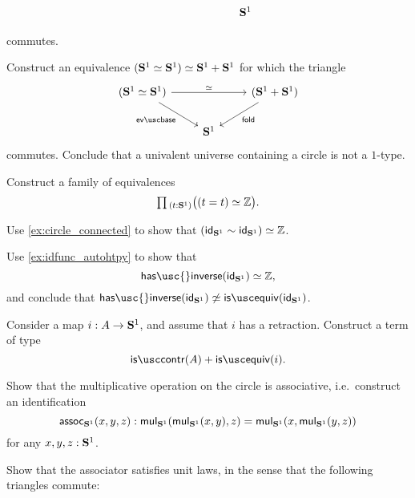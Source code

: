 \begin{exercises}
\begin{subexenum}
\begin{equation*}
\begin{tikzcd}[column sep=tiny]
\phantom{\sm{t:\sphere{1}}\mathcal{T}(t)} & \sphere{1}
\end{tikzcd}
\end{equation*}
commutes.
\end{subexenum}
\exercise Construct an equivalence $\eqv{(\eqv{\sphere{1}}{\sphere{1}})}{\sphere{1}+\sphere{1}}$ for which the triangle
\begin{equation*}
  \begin{tikzcd}
    (\eqv{\sphere{1}}{\sphere{1}}) \arrow[rr,"\simeq"] \arrow[dr,swap,"\evbase"] & & (\sphere{1}+\sphere{1}) \arrow[dl,"\fold"] \\
    & \sphere{1}
  \end{tikzcd}
\end{equation*}
commutes. Conclude that a univalent universe containing a circle is not a $1$-type.
\exercise \label{ex:is_invertible_id_S1}
\begin{subexenum}
\item Construct a family of equivalences
\begin{equation*}
\prd{t:\sphere{1}} \big(\eqv{(t=t)}{\Z}\big).
\end{equation*}
\item Use \cref{ex:circle_connected} to show that $\eqv{(\idfunc[\sphere{1}]\htpy\idfunc[\sphere{1}])}{\Z}$.
\item Use \cref{ex:idfunc_autohtpy} to show that
\begin{equation*}
\eqv{\mathsf{has\usc{}inverse}(\idfunc[\sphere{1}])}{\Z},
\end{equation*}
and conclude that ${\mathsf{has\usc{}inverse}}(\idfunc[\sphere{1}])\not\simeq{\isequiv(\idfunc[\sphere{1}])}$. 
\end{subexenum}
\exercise Consider a map $i:A \to \mathbf{S}^{1}$, and assume that $i$ has a retraction. Construct a term of type
  \begin{equation*}
    \iscontr(A)+\isequiv(i).
  \end{equation*}
  \exercise
  \begin{subexenum}
  \item Show that the multiplicative operation on the circle is associative, i.e.~construct an identification
    \begin{equation*}
      \mathsf{assoc}_{\mathbf{S}^{1}}(x,y,z) :
      \mathsf{mul}_{\mathbf{S}^{1}}(\mathsf{mul}_{\mathbf{S}^{1}}(x,y),z)=\mathsf{mul}_{\mathbf{S}^{1}}(x,\mathsf{mul}_{\mathbf{S}^{1}}(y,z))
    \end{equation*}
    for any $x,y,z:\mathbf{S}^{1}$.
  \item Show that the associator satisfies unit laws, in the sense that the following triangles commute:

\end{subexenum}
\end{exercises}
